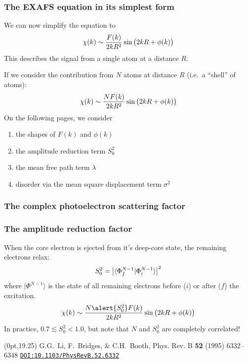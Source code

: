 \documentclass[10pt, xcolor=x11names, compress]{beamer}
\begin{document}
\begin{frame}
  \frametitle{The EXAFS equation in its simplest form}
  We can now simplify the equation to
  \begin{equation}
    \chi(k) \sim \frac{F(k)}{2kR^2}\sin\big(2kR+\phi(k)\big)
    \notag
  \end{equation}
  This describes the signal from a single atom at a distance $R$.

  \medskip

  If we consider the contribution from $N$ atoms at distance $R$
  (i.e.\ a ``shell'' of atoms):
  \begin{equation}
    \chi(k) \sim \frac{NF(k)}{2kR^2}\sin\big(2kR+\phi(k)\big)
    \notag
  \end{equation}
  On the following pages, we consider
  \begin{enumerate}
  \item the shapes of $F(k)$ and $\phi(k)$
  \item the amplitude reduction term $S_0^2$
  \item the mean free path term $\lambda$
  \item disorder via the mean square displacement term $\sigma^2$
  \end{enumerate}
\end{frame}

\begin{frame}
  \frametitle{The complex photoelectron scattering factor}
  
\end{frame}

\begin{frame}
  \frametitle{The amplitude reduction factor}

  When the core electron is ejected from it's deep-core state, the
  remaining electrons relax:
  \begin{equation}
    S_0^2 = \big|\langle \Phi_f^{N-1}  | \Phi_i^{N-1}  \rangle
    \big|^2    \notag
  \end{equation}
  where $|\Phi^{N-1}\rangle$ is the state of all remaining electrons
  before ($i$) or after ($f$) the excitation.
  \begin{equation}
    \chi(k) \sim \frac{N\alert{S_0^2}F(k)}{2kR^2}\sin\big(2kR+\phi(k)\big)
    \notag
  \end{equation}
  In practice, $0.7\lesssim S_0^2<1.0$, but note that $N$ and $S_0^2$
  are completely correlated!
  \begin{textblock*}{0.6\linewidth}(0pt,19.25\TPVertModule)%
    \tiny%
    G.G.\ Li, F.\ Bridges, \& C.H.\ Booth, Phys. Rev. B \textbf{52}
    (1995) 6332--6348
    \href{http://dx.doi.org/10.1103/PhysRevB.52.6332}
    {\color{Blue4}\texttt{DOI:10.1103/PhysRevB.52.6332}}
  \end{textblock*}
\end{frame}
\end{document}
